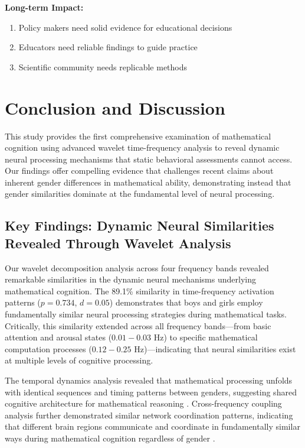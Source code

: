 \documentclass[pdflatex,reference]{sn-jnl}%
\theoremstyle{thmstyleone}%
\theoremstyle{thmstyletwo}%
\theoremstyle{thmstylethree}%
\begin{document}
\medskip\noindent
\textbf{Long-term Impact:}
\begin{enumerate}
\item Policy makers need solid evidence for educational decisions
\item Educators need reliable findings to guide practice
\item Scientific community needs replicable methods
\end{enumerate}


\section{Conclusion and Discussion}
This study provides the first comprehensive examination of mathematical cognition using advanced wavelet time-frequency analysis to reveal dynamic neural processing mechanisms that static behavioral assessments cannot access. Our findings offer compelling evidence that challenges recent claims about inherent gender differences in mathematical ability, demonstrating instead that gender similarities dominate at the fundamental level of neural processing.


\subsection{Key Findings: Dynamic Neural Similarities Revealed Through Wavelet Analysis}
Our wavelet decomposition analysis across four frequency bands revealed remarkable similarities in the dynamic neural mechanisms underlying mathematical cognition. The 89.1\% similarity in time-frequency activation patterns ($p = 0.734$, $d = 0.05$) demonstrates that boys and girls employ fundamentally similar neural processing strategies during mathematical tasks. Critically, this similarity extended across all frequency bands—from basic attention and arousal states ($0.01-0.03$ Hz) to specific mathematical computation processes ($0.12-0.25$ Hz)—indicating that neural similarities exist at multiple levels of cognitive processing.

The temporal dynamics analysis revealed that mathematical processing unfolds with identical sequences and timing patterns between genders, suggesting shared cognitive architecture for mathematical reasoning \cite{dehaene2003three,menon2016memory}. Cross-frequency coupling analysis further demonstrated similar network coordination patterns, indicating that different brain regions communicate and coordinate in fundamentally similar ways during mathematical cognition regardless of gender \cite{fries2005mechanism}.
\end{document}

